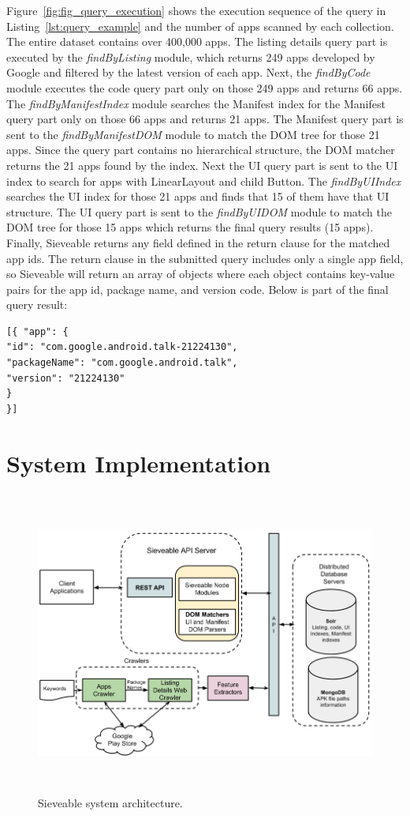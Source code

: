 Figure~\ref{fig:fig_query_execution} shows the execution sequence of the query in Listing~\ref{lst:query_example} and the number of apps scanned by each collection.
The entire dataset contains over 400,000 apps.
The listing details query part is executed by the \textit{findByListing} module, which returns 249 apps developed by Google and filtered by the latest version of each app.
Next, the \textit{findByCode} module executes the code query part only on those 249 apps and returns 66 apps.
The \textit{findByManifestIndex} module searches the Manifest index for the Manifest query part only on those 66 apps and returns 21 apps.
The Manifest query part is sent to the \textit{findByManifestDOM} module to match the DOM tree for those 21 apps. Since the query part contains no hierarchical structure, the DOM matcher returns the 21 apps found by the index.
Next the UI query part is sent to the UI index to search for apps with LinearLayout and child Button.
The \textit{findByUIIndex} searches the UI index for those 21 apps  and finds that 15 of them have that UI structure.
The UI query part is sent to the \textit{findByUIDOM} module to match the DOM tree for those 15 apps which returns the final query results (15 apps).
Finally, Sieveable returns any field defined in the return clause for the matched app ids.
The return clause in the submitted query includes only a single app field, so Sieveable will return an array of objects where each object contains key-value pairs for the app id, package name, and version code. Below is part of the final query result:
\begin{verbatim}
[{ "app": { 
"id": "com.google.android.talk-21224130",
"packageName": "com.google.android.talk",
"version": "21224130"
}
}]
\end{verbatim}

\section{System Implementation}
\begin{figure}[!t]
	\centering
	\includegraphics[width=17cm, height=10cm]{figures/sieveable-deep-search/architecture}
	\caption{Sieveable system architecture.}
	\label{fig:fig_architecture}
\end{figure}

